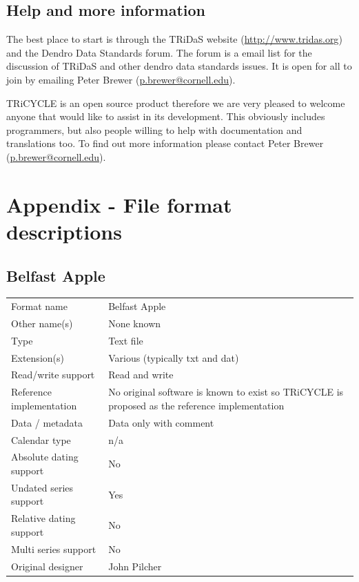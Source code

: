 \documentclass[10pt, headsepline,DIV14,BCOR0.5cm]{scrreprt}
\begin{document}
\chapter{Help and more information}

The best place to start is through the TRiDaS website (\url{http://www.tridas.org}) and the
Dendro Data Standards forum. The forum is a email list for the discussion of TRiDaS and other dendro
data standards issues. It is open for all to join by emailing Peter Brewer (\href{mailto:p.brewer@cornell.edu}{p.brewer@cornell.edu}).

TRiCYCLE is an open source product therefore we are very pleased to welcome anyone that would
like to assist in its development. This obviously includes programmers, but also people willing to help
with documentation and translations too. To find out more information please contact Peter Brewer
(\href{mailto:p.brewer@cornell.edu}{p.brewer@cornell.edu}).

\part*{Appendix - File format descriptions}

\appendix
\chapter{Belfast Apple}

\begin{table}[htbp]
\label{summary:belfastApple}
\begin{center}
\begin{tabular*}{15cm}{ l @{\extracolsep{\fill}} p{9cm} }
  \toprule

Format name     	 & Belfast Apple \\
Other name(s)      	 & None known \\
Type      	 	 & Text file \\
Extension(s)      	 & Various (typically txt and dat) \\
Read/write support     	 & Read and write \\
Reference implementation & No original software is known to exist so TRiCYCLE is proposed as the reference implementation \\
Data / metadata      	 & Data only with comment \\
Calendar type		 & n/a \\
Absolute dating support	 & No \\
Undated series support   & Yes \\
Relative dating support  & No \\
Multi series support	 & No \\
Original designer	 & John Pilcher \\

\bottomrule
\end{tabular*}
\end{center}
\end{table}
\end{document}
